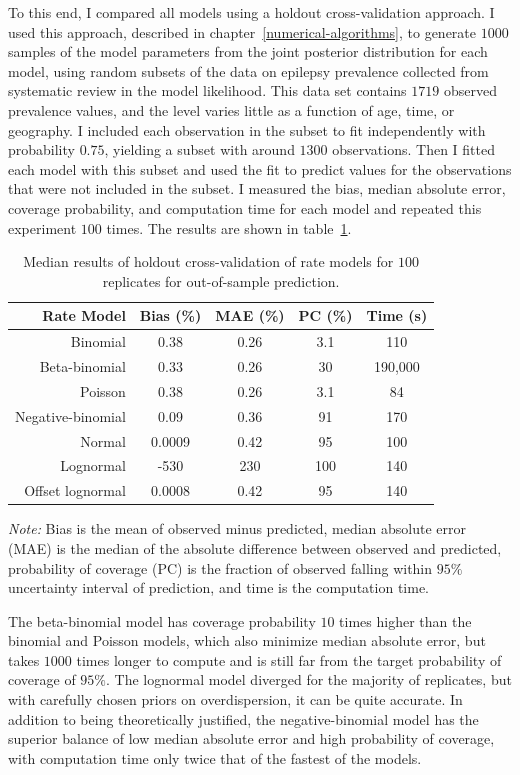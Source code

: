 To this end, I compared all models using a holdout cross-validation
approach.  I used this approach, described in
chapter~\ref{numerical-algorithms}, to generate $1000$ samples of the
model parameters from the joint posterior distribution for each model,
using random subsets of the data on epilepsy prevalence collected from
systematic review\cite{TK_Epilepsy_EG_report} in the model likelihood.  This data set
contains $1719$ observed prevalence values, and the level varies
little as a function of age, time, or geography.  I included each
observation in the subset to fit independently with probability $0.75$,
yielding a subset with around $1300$ observations. Then I fitted each
model with this subset and used the fit to predict values for the
observations that were not included in the subset.  I measured the
bias, median absolute error, coverage probability, and computation
time for each model and repeated this experiment $100$ times.  The
results are shown in table~\ref{rate-comparison}.

\begin{table}
\caption{Median results of holdout cross-validation of rate models
  for $100$ replicates for out-of-sample prediction.}
\label{rate-comparison}
\begin{center}
\begin{tabular}{|r|c|c|c|c|}
\hline
Rate Model       &Bias (\%)&MAE (\%)&PC (\%)&Time (s)\\
\hline
Binomial         &0.38     &0.26    &3.1    &110\\
Beta-binomial    &0.33     &0.26    &30     &190,000\\
Poisson          &0.38     &0.26    &3.1    &84\\
Negative-binomial&0.09     &0.36    &91     &170\\
Normal           &0.0009   &0.42    &95     &100\\
Lognormal       &-530     &230     &100    &140\\
Offset lognormal&0.0008   &0.42    &95     &140\\
\hline
\end{tabular}
\end{center}
\emph{Note:} Bias is the mean
  of observed minus predicted, median absolute error (MAE) is the median of
  the absolute difference between observed and predicted, probability
  of coverage (PC) is the fraction of observed falling within $95\%$ uncertainty
  interval of prediction, and time is the computation time.
\end{table}


  The beta-binomial
  model has coverage probability $10$ times higher than the binomial and Poisson models,
  which also minimize median absolute error, but takes $1000$ times
  longer to compute and is still far from the target probability of coverage of $95\%$.
  The lognormal model diverged for the majority of replicates, but
  with carefully chosen priors on overdispersion, it can be quite
  accurate.  In addition to being theoretically justified, the
  negative-binomial model has the superior balance of low median absolute error and high
  probability of coverage, with computation time only twice that of the fastest of the
  models.
